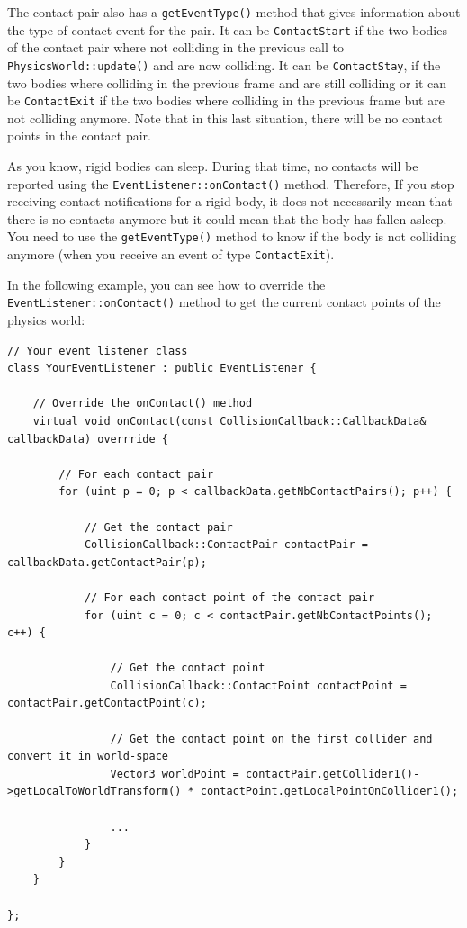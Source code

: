 \documentclass[a4paper,12pt]{article}
\begin{document}
    \begin{sloppypar}
    The contact pair also has a \texttt{getEventType()} method that gives information about the type of contact event for the pair. It can be
    \texttt{ContactStart} if the two bodies of the contact pair where not colliding in the previous call to \texttt{PhysicsWorld::update()} and are now
    colliding. It can be \texttt{ContactStay}, if the two bodies where colliding in the previous frame and are still colliding or it can be
    \texttt{ContactExit} if the two bodies where colliding in the previous frame but are not colliding anymore. Note that in this last situation, there
    will be no contact points in the contact pair. \\
    \end{sloppypar}

    \begin{sloppypar}
    As you know, rigid bodies can sleep. During that time, no contacts will be reported using the \texttt{EventListener::onContact()} method. Therefore,
    If you stop receiving contact notifications for a rigid body, it does not necessarily mean that there is no contacts anymore but it could mean that the
    body has fallen asleep. You need to use the \texttt{getEventType()} method to know if the body is not colliding anymore (when you receive an event of type
    \texttt{ContactExit}). \\
    \end{sloppypar}

    \begin{sloppypar}
    In the following example, you can see how to override the \texttt{EventListener::onContact()} method to get the current contact points of the physics
    world: \\
    \end{sloppypar}

    \begin{lstlisting}
// Your event listener class
class YourEventListener : public EventListener {

	// Override the onContact() method
	virtual void onContact(const CollisionCallback::CallbackData& callbackData) overrride {

		// For each contact pair
		for (uint p = 0; p < callbackData.getNbContactPairs(); p++) {

			// Get the contact pair
			CollisionCallback::ContactPair contactPair = callbackData.getContactPair(p);

			// For each contact point of the contact pair
			for (uint c = 0; c < contactPair.getNbContactPoints(); c++) {

			    // Get the contact point
			    CollisionCallback::ContactPoint contactPoint = contactPair.getContactPoint(c);

			    // Get the contact point on the first collider and convert it in world-space
			    Vector3 worldPoint = contactPair.getCollider1()->getLocalToWorldTransform() * contactPoint.getLocalPointOnCollider1();

			    ...
			}
		}
	}

};
    \end{lstlisting}
\end{document}
